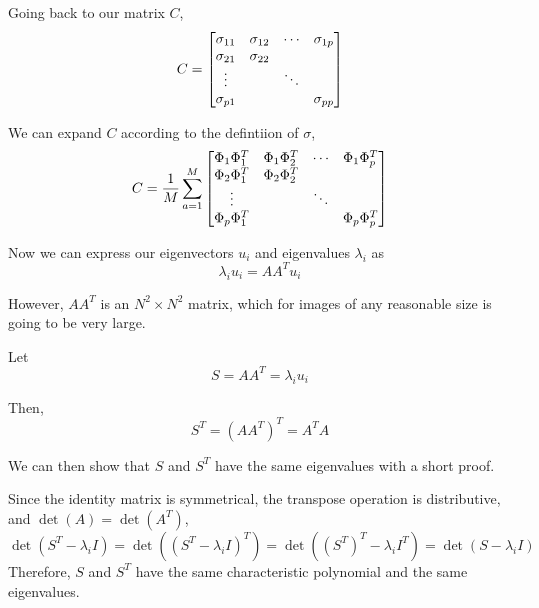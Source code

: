 \documentclass[12pt]{report}
\begin{document}
            \begin{myproof}
                Going back to our matrix $C$,
                    \[
                        C = \begin{bmatrix}
                            \sigma_{11} & \sigma_{12} & \cdots & \sigma_{1p} \\
                            \sigma_{21} & \sigma_{22} &        &             \\
                            \vdots      &             & \ddots &             \\
                            \sigma_{p1} &             &        & \sigma_{pp}
                        \end{bmatrix}
                    \]
                
                We can expand $C$ according to the defintiion of $\sigma$,
                    \[
                        C = \frac{1}{M} \sum_{a=1}^M \begin{bmatrix}
                            \Phi_1 \Phi_1^T & \Phi_1 \Phi_2^T & \cdots & \Phi_1 \Phi_p^T \\
                            \Phi_2 \Phi_1^T & \Phi_2 \Phi_2^T &        &                 \\
                            \vdots          &                 & \ddots &                 \\
                            \Phi_p \Phi_1^T &                 &        & \Phi_p \Phi_p^T
                        \end{bmatrix}
                    \]

            \end{myproof}

            Now we can express our eigenvectors $u_i$ and eigenvalues $\lambda_i$ as
                \[
                    \lambda _{i} u_{i} =AA^{T} u_{i}
                \]

            However, $AA^T$ is an $N^2 \times N^2$ matrix, which for images of any reasonable size is going to be very large.

            Let 
                \[
                    S = AA^T = \lambda_i u_i
                \]
            
            Then,
                \[
                    S^T = (AA^T)^T = A^T A
                \]

            We can then show that $S$ and $S^T$ have the same eigenvalues with a short proof.

            \begin{myproof}
                Since the identity matrix is symmetrical, the transpose operation is distributive, and $\det(A) = \det\left(A^T\right)$,
                    \[
                        \det\left(S^T - \lambda_i I\right) = \det\left(\left(S^T - \lambda_i I\right)^T\right) = \det\left(\left(S^T\right)^T - \lambda_i I^T\right) = \det(S - \lambda_i I)
                    \]
                Therefore, $S$ and $S^T$ have the same characteristic polynomial and the same eigenvalues.
            \end{myproof}
\end{document}
